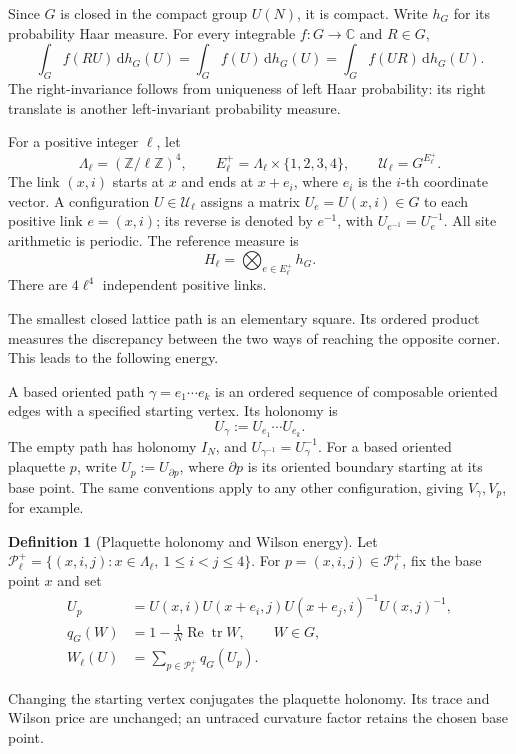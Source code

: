 \documentclass[11pt,reqno]{amsart}
\numberwithin{equation}{section}
\theoremstyle{definition}
\newtheorem{definition}[theorem]{Definition}
\theoremstyle{remark}
\newcommand{\C}{\mathbb C}
\newcommand{\Z}{\mathbb Z}
\newcommand{\dd}{\mathrm d}
\DeclareMathOperator{\tr}{tr}
\begin{document}
Since \(G\) is closed in the compact group \(U(N)\), it is compact.
Write \(h_G\) for its probability Haar measure. For every integrable
\(f:G\to\C\) and \(R\in G\),
\begin{equation}
 \int_G f(RU)\,\dd h_G(U)
 =\int_G f(U)\,\dd h_G(U)
 =\int_G f(UR)\,\dd h_G(U).
 \label{eq:haar-invariance}
\end{equation}
The right-invariance follows from uniqueness of left Haar probability:
its right translate is another left-invariant probability measure.

For a positive integer \(\ell\), let
\begin{equation}
 \Lambda_\ell=(\Z/\ell\Z)^4,\qquad
 E_\ell^+=\Lambda_\ell\times\{1,2,3,4\},\qquad
 \mathcal U_\ell=G^{E_\ell^+}.
 \label{eq:lattice}
\end{equation}
The link \((x,i)\) starts at \(x\) and ends at \(x+e_i\), where
\(e_i\) is the \(i\)-th coordinate vector. A configuration
\(U\in\mathcal U_\ell\) assigns a matrix \(U_e=U(x,i)\in G\) to each
positive link \(e=(x,i)\); its reverse is denoted by \(e^{-1}\), with
\(U_{e^{-1}}=U_e^{-1}\). All site
arithmetic is periodic. The reference measure is
\[
 H_\ell=\bigotimes_{e\in E_\ell^+}h_G.
\]
There are \(4\ell^4\) independent positive links.

The smallest closed lattice path is an elementary square. Its ordered
product measures the discrepancy between the two ways of reaching
the opposite corner. This leads to the following energy.

A based oriented path \(\gamma=e_1\cdots e_k\) is an ordered
sequence of composable oriented edges with a specified starting
vertex. Its holonomy is
\[
                  U_\gamma:=U_{e_1}\cdots U_{e_k}.
\]
The empty path has holonomy \(I_N\), and
\(U_{\gamma^{-1}}=U_\gamma^{-1}\).
For a based oriented plaquette \(p\), write \(U_p:=U_{\partial p}\),
where \(\partial p\) is its oriented boundary starting at its base point.
The same conventions apply to any other configuration, giving
\(V_\gamma,V_p\), for example.

\begin{definition}[Plaquette holonomy and Wilson energy]
Let \(\mathcal P_\ell^+=\{(x,i,j):x\in\Lambda_\ell,\ 1\le i<j\le4\}\).
For \(p=(x,i,j)\in\mathcal P_\ell^+\), fix the base point \(x\) and set
\begin{align}
 U_p&=U(x,i)U(x+e_i,j)
                         U(x+e_j,i)^{-1}U(x,j)^{-1},\label{eq:plaquette}\\
 q_G(W)&=1-\frac1N\operatorname{Re}\tr W,\qquad W\in G,\label{eq:q}\\
 W_\ell(U)&=\sum_{p\in\mathcal P_\ell^+}q_G(U_p).
 \label{eq:wilson-energy}
\end{align}
\end{definition}
Changing the starting vertex conjugates the plaquette holonomy.
Its trace and Wilson price are unchanged; an untraced curvature
factor retains the chosen base point.
\end{document}
